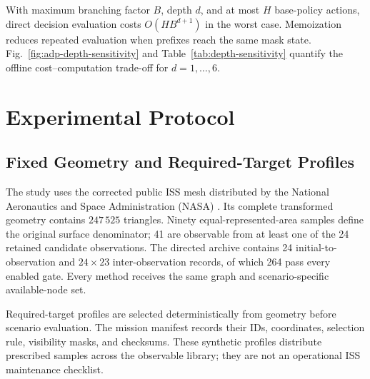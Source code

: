 \documentclass{IEEEtaes}
\theoremstyle{remark}
\theoremstyle{plain}
\begin{document}
With maximum branching factor $B$, depth $d$, and at most $H$ base-policy actions, direct decision evaluation costs $O(HB^{d+1})$ in the worst case. Memoization reduces repeated evaluation when prefixes reach the same mask state. Fig.~\ref{fig:adp-depth-sensitivity} and Table~\ref{tab:depth-sensitivity} quantify the offline cost--computation trade-off for $d=1,\ldots,6$.


\section{Experimental Protocol}
\label{sec:simulation}

\subsection{Fixed Geometry and Required-Target Profiles}

The study uses the corrected public ISS mesh distributed by the National Aeronautics and Space Administration (NASA) \cite{nasa_iss_gltf_model}. Its complete transformed geometry contains $247\,525$ triangles. Ninety equal-represented-area samples define the original surface denominator; 41 are observable from at least one of the 24 retained candidate observations. The directed archive contains 24 initial-to-observation and $24\times23$ inter-observation records, of which 264 pass every enabled gate. Every method receives the same graph and scenario-specific available-node set.

Required-target profiles are selected deterministically from geometry before scenario evaluation. The mission manifest records their IDs, coordinates, selection rule, visibility masks, and checksums. These synthetic profiles distribute prescribed samples across the observable library; they are not an operational ISS maintenance checklist.
\end{document}
